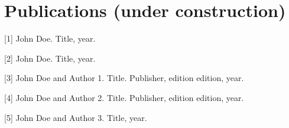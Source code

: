 \documentclass[10pt,a4paper,sans,colorlinks=true]{moderncv}        %
\begin{document}
\section{Publications (under
construction)}\label{publications-under-construction}

{[}1{]} John Doe. Title, year.

{[}2{]} John Doe. Title, year.

{[}3{]} John Doe and Author 1. Title. Publisher, edition edition, year.

{[}4{]} John Doe and Author 2. Title. Publisher, edition edition, year.

{[}5{]} John Doe and Author 3. Title, year.
\end{document}
